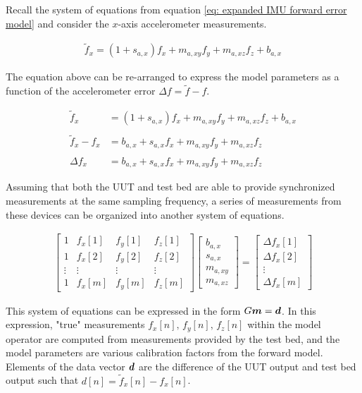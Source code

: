 Recall the system of equations from equation \ref{eq: expanded IMU forward error model} and consider the $x$-axis accelerometer measurements.

\begin{align*}
	\tilde{f}_x = \left(1 + s_{a,x}\right) f_x + m_{a,xy} f_y + m_{a,xz} f_z + b_{a,x}
\end{align*}

The equation above can be re-arranged to express the model parameters as a function of the accelerometer error $\Delta f = \tilde{f} - f$. 

\begin{align*}
	\tilde{f}_x &= \left(1 + s_{a,x}\right) f_x + m_{a,xy} f_y + m_{a,xz} f_z + b_{a,x} \\
	\\
	\tilde{f}_x - f_x &= b_{a,x} + s_{a,x} f_x + m_{a,xy} f_y + m_{a,xz} f_z \\
	\\
	\Delta f_x &= b_{a,x} + s_{a,x} f_x + m_{a,xy} f_y + m_{a,xz} f_z
\end{align*}

Assuming that both the UUT and test bed are able to provide synchronized measurements at the same sampling frequency, a series of measurements from these devices can be organized into another system of equations. 

\begin{align} \label{eq: expanded block of GM = d}
	\begin{bmatrix} 
		1 & f_x[1] & f_y[1] & f_z[1] \\ 1 & f_x[2] & f_y[2] & f_z[2] \\ \vdots & \vdots & \vdots & \vdots \\ 1 & f_x[m] & f_y[m] & f_z[m]
	\end{bmatrix} \begin{bmatrix}
		b_{a,x} \\ s_{a,x} \\ m_{a,xy} \\ m_{a,xz}
	\end{bmatrix} = \begin{bmatrix}
		\Delta f_x[1] \\ \Delta f_x[2] \\ \vdots \\ \Delta f_x[m]
	\end{bmatrix}
\end{align}

This system of equations can be expressed in the form $G\boldsymbol{m} = \boldsymbol{d}$. In this expression, "true" measurements $f_x[n],\,f_y[n],\,f_z[n]$ within the model operator are computed from measurements provided by the test bed, and the model parameters are various calibration factors from the forward model. Elements of the data vector $\boldsymbol{d}$ are the difference of the UUT output and test bed output such that $d[n] = \tilde{f}_x[n] - f_x[n]$.

